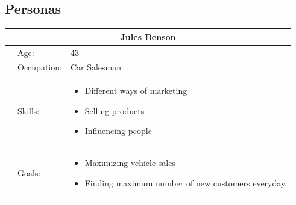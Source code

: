         \subsection{Personas}
            {\raggedright

            \vspace{3pt} \noindent
            \begin{tabular}{|p{130pt}|p{88pt}|p{207pt}|}
            \hline
            \multicolumn{3}{|c|}{\parbox{426pt}{\centering
            Jules Benson
            }} \\
            \hline
            \parbox{130pt}{\raggedright {}} & \parbox{88pt}{\raggedright
            Age:
            } & \parbox{207pt}{\raggedright
            43
            } \\
             & \parbox{88pt}{\raggedright
            Occupation:
            } & \parbox{207pt}{\raggedright
            Car Salesman
            } \\
             & \parbox{88pt}{\raggedright
            Skills:
            } & \parbox{207pt}{\raggedright
            \begin{itemize}
                \item Different ways of marketing
                \item Selling products
                \item Influencing people
            \end{itemize}
            } \\
             & \parbox{88pt}{\raggedright
            Goals:
            } & \parbox{207pt}{\raggedright
            \begin{itemize}
                \item Maximizing vehicle sales
                \item Finding maximum number of new customers everyday.

\end{itemize}}
\end{tabular}}

